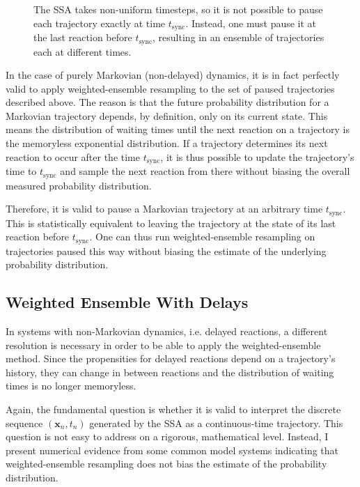 \documentclass[english,letterpaper,12pt]{article}
\renewcommand{\vec}[1]{\ensuremath{\mathbf{#1}}}
\begin{document}
\begin{doublespacing}
\begin{figure}[ht]
    \centering
    \def\svgwidth{0.65\textwidth}
    
    \caption{The SSA takes non-uniform timesteps, so it is not possible to pause each trajectory exactly at time $t_\text{sync}$. Instead, one must pause it at the last reaction before $t_\text{sync}$, resulting in an ensemble of trajectories each at different times.}
    \label{fig:wessa-pause}
\end{figure}

In the case of purely Markovian (non-delayed) dynamics, it is in fact perfectly valid to apply weighted-ensemble resampling to the set of paused trajectories described above. The reason is that the future probability distribution for a Markovian trajectory depends, by definition, only on its current state. This means the distribution of waiting times until the next reaction on a trajectory is the memoryless exponential distribution. If a trajectory determines its next reaction to occur after the time $t_\text{sync}$, it is thus possible to update the trajectory's time to $t_\text{sync}$ and sample the next reaction from there without biasing the overall measured probability distribution. 

Therefore, it is valid to pause a Markovian trajectory at an arbitrary time $t_\text{sync}$. This is statistically equivalent to leaving the trajectory at the state of its last reaction before $t_\text{sync}$. One can thus run weighted-ensemble resampling on trajectories paused this way without biasing the estimate of the underlying probability distribution.


\subsection{Weighted Ensemble With Delays} %
\label{sub:we-delays}

In systems with non-Markovian dynamics, i.e. delayed reactions, a different resolution is necessary in order to be able to apply the weighted-ensemble method. Since the propensities for delayed reactions depend on a trajectory's history, they can change in between reactions and the distribution of waiting times is no longer memoryless.

Again, the fundamental question is whether it is valid to interpret the discrete sequence $(\vec{x}_n, t_n)$ generated by the SSA as a continuous-time trajectory. This question is not easy to address on a rigorous, mathematical level. Instead, I present numerical evidence from some common model systems indicating that weighted-ensemble resampling does not bias the estimate of the probability distribution.


\end{doublespacing}
\end{document}
